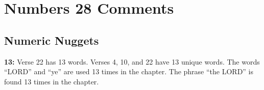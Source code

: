 \section{Numbers 28 Comments}

\subsection{Numeric Nuggets}
\textbf{13: } Verse 22 has 13 words. Verses 4, 10, and 22 have 13 unique words. The words ``LORD'' and ``ye'' are used 13 times in the chapter. The phrase ``the LORD'' is found 13 times in the chapter.

